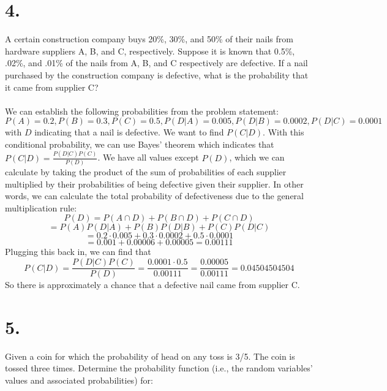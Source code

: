 \documentclass{article}
\begin{document}
{\section*{4.}
A certain construction company buys 20\%, 30\%, and 50\% of their nails from hardware suppliers A, B, and C, respectively. Suppose it is known that 0.5\%, .02\%, and .01\% of the nails from A, B, and C respectively are defective. If a nail purchased by the construction company is defective, what is the probability that it came from supplier C?\@
\\
\\
We can establish the following probabilities from the problem statement: \(P(A) = 0.2, P(B) = 0.3, P(C) = 0.5, P(D|A) = 0.005, P(D|B) = 0.0002, P(D|C) = 0.0001 \) with \( D \) indicating that a nail is defective. We want to find \( P(C|D) \). With this conditional probability, we can use Bayes' theorem which indicates that \( P(C|D) = \frac{P(D|C)P(C)}{P(D)} \). We have all values except \(P(D)\), which we can calculate by taking the product of the sum of probabilities of each supplier multiplied by their probabilities of being defective given their supplier. In other words, we can calculate the total probability of defectiveness due to the general multiplication rule:
\[
P(D) = P(A \cap D) + P(B \cap D) + P(C \cap D)
\]
\[
= P(A)P(D|A) + P(B)P(D|B) + P(C)P(D|C)
\]
\[
= 0.2 \cdot 0.005 + 0.3 \cdot 0.0002 + 0.5 \cdot 0.0001 
\]
\[
= 0.001 + 0.00006 + 0.00005 = 0.00111
\]
Plugging this back in, we can find that 
\[
P(C|D) = \frac{P(D|C)P(C)}{P(D)} = \frac{0.0001 \cdot 0.5}{0.00111} = \frac{0.00005}{0.00111} = 0.04504504504
\]
So there is approximately a  chance that a defective nail came from supplier C.

\section*{5.}
Given a coin for which the probability of head on any toss is 3/5. The coin is tossed three times. Determine the probability function (i.e., the random variables' values and associated
probabilities) for:

}
\end{document}
